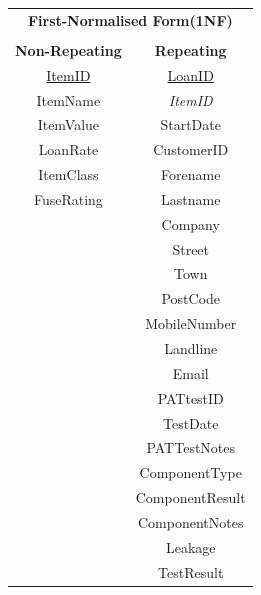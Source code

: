 \newpage

\begin{center}
    \begin{tabular}{|c|c|}
        \hline
        \multicolumn{2}{|c|}{\textbf{First-Normalised Form(1NF)}} \\
        \multicolumn{2}{|c|}{ }                                   \\ \hline
        \textbf{Non-Repeating} & \textbf{Repeating}               \\ \hline
        \underline{ItemID}     & \underline{LoanID}               \\ 
        ItemName               & \emph{ItemID}                    \\ 
        ItemValue	          & StartDate                        \\ 
        LoanRate    	          & CustomerID                       \\ 
        ItemClass              & Forename                         \\ 
        FuseRating             & Lastname                         \\ 
              	              & Company                          \\ 
                               & Street                           \\ 
                               & Town                             \\ 
                               & PostCode                         \\ 
                               & MobileNumber                     \\ 
                               & Landline                         \\ 
                               & Email                            \\ 
                               & PATtestID                        \\ 
                               & TestDate                         \\ 
                               & PATTestNotes                     \\ 
                               & ComponentType                    \\
                               & ComponentResult                  \\
                               & ComponentNotes                   \\
                               & Leakage                          \\ 
                               & TestResult                       \\ \hline
    \end{tabular}
\end{center}

